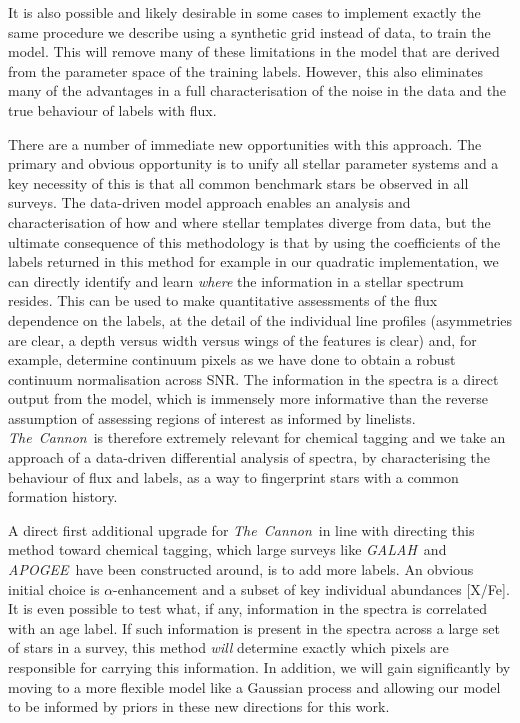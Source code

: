 \documentclass[12pt, preprint]{aastex}
\newcommand{\tc}{\textsl{The~Cannon}}
\newcommand{\apogee}{\textsl{APOGEE}}
\newcommand{\galah}{\textsl{GALAH}}
\begin{document}
 It is also possible and likely desirable in some cases to implement exactly the same procedure we describe using a synthetic grid instead of data, to train the model. This will remove many of these limitations in the model that are derived from the parameter space of the training labels. However, this also eliminates many of the advantages in a full characterisation of the noise in the data and the true behaviour of labels with flux.%
 


There are a number of immediate new opportunities with this approach. The primary and obvious opportunity is to unify all stellar parameter systems and a key necessity of this is that all common benchmark stars be observed in all surveys. The data-driven model approach enables an analysis and characterisation of how and where stellar templates diverge from data, but the ultimate consequence of this methodology is that by using the coefficients of the labels returned in this method for example in our quadratic implementation, we can directly identify and learn \textit{where} the information in a stellar spectrum resides. This can be used to make quantitative assessments of the flux dependence on the labels, at the detail of the individual line profiles (asymmetries are clear, a depth versus width versus wings of the features is clear) and, for example, determine continuum pixels as we have done to obtain a robust continuum normalisation across SNR. The information in the spectra  is a direct output from the model, which is immensely more informative than the reverse assumption of assessing regions of interest as informed by linelists.  \tc\ is therefore extremely relevant for chemical tagging and we take an approach of a data-driven differential analysis of spectra, by characterising the behaviour of flux and labels, as a way to fingerprint stars with a common formation history.

A direct first additional upgrade for \tc\ in line with directing this method toward chemical tagging, which large surveys like \galah\ and \apogee\ have been constructed around,  is  to add more labels. An obvious initial choice is $\alpha$-enhancement and a subset of key individual abundances [X/Fe]. It is even possible to test what, if any, information in the spectra is correlated with an age label. If such information is present in the spectra across a large set of stars in a survey, this method \textit{will} determine exactly which pixels are responsible for carrying this information. In addition, we will gain significantly by moving to a more flexible model like a Gaussian process and allowing our model to be informed by priors in these new directions for this work. 
\end{document}

